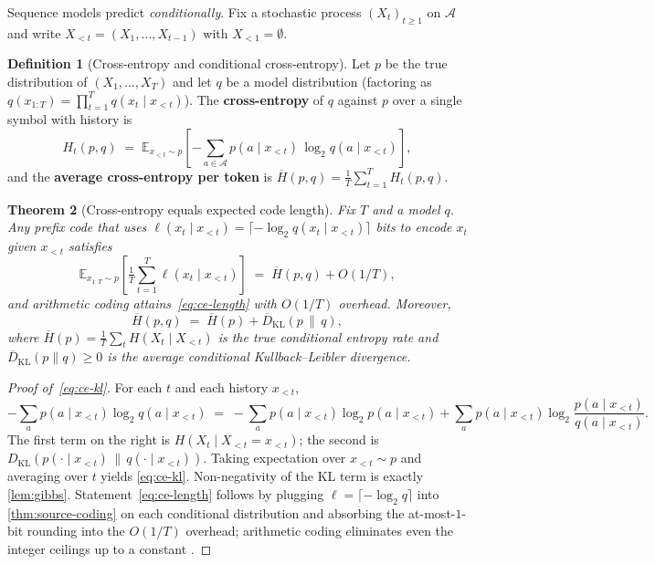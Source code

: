 \documentclass[12pt,a4paper]{article}
\theoremstyle{plain}
\newtheorem{theorem}{Theorem}[section]
\theoremstyle{definition}
\newtheorem{definition}[theorem]{Definition}
\begin{document}
Sequence models predict \emph{conditionally}.  Fix a stochastic
process $(X_t)_{t \ge 1}$ on $\mathcal{A}$ and write
$X_{<t} = (X_1, \dots, X_{t-1})$ with $X_{<1} = \emptyset$.

\begin{definition}[Cross-entropy and conditional cross-entropy]
\label{def:cross-ent}
Let $p$ be the true distribution of $(X_1, \dots, X_T)$ and let $q$ be
a model distribution (factoring as
$q(x_{1:T}) = \prod_{t=1}^{T} q(x_t \mid x_{<t})$).  The
\textbf{cross-entropy} of $q$ against $p$ over a single symbol with
history is
\begin{equation}
  H_t(p, q)
  \;=\; \mathbb{E}_{x_{<t}\sim p}\!\left[
    -\sum_{a\in\mathcal{A}} p(a \mid x_{<t})\,\log_2 q(a \mid x_{<t})
  \right],
  \label{eq:cross-ent}
\end{equation}
and the \textbf{average cross-entropy per token} is
$\overline{H}(p,q) = \tfrac{1}{T}\sum_{t=1}^{T} H_t(p,q)$.
\end{definition}

\begin{theorem}[Cross-entropy equals expected code length]
\label{thm:ce-code}
Fix $T$ and a model $q$.  Any prefix code that uses
$\ell(x_t \mid x_{<t}) = \lceil -\log_2 q(x_t \mid x_{<t})\rceil$
bits to encode $x_t$ given $x_{<t}$ satisfies
\begin{equation}
  \mathbb{E}_{x_{1:T}\sim p}\!\left[\tfrac{1}{T}\!\sum_{t=1}^{T}\ell(x_t \mid x_{<t})\right]
  \;=\; \overline{H}(p, q) + O(1/T),
  \label{eq:ce-length}
\end{equation}
and arithmetic coding attains~\eqref{eq:ce-length} with $O(1/T)$
overhead.  Moreover,
\begin{equation}
  \overline{H}(p, q)
  \;=\; \overline{H}(p) + \overline{D}_{\mathrm{KL}}(p \,\|\, q),
  \label{eq:ce-kl}
\end{equation}
where $\overline{H}(p) = \tfrac{1}{T}\sum_t H(X_t \mid X_{<t})$ is the
true conditional entropy rate and
$\overline{D}_{\mathrm{KL}}(p\|q) \ge 0$ is the average conditional
Kullback--Leibler divergence.
\end{theorem}

\begin{proof}[Proof of~\eqref{eq:ce-kl}]
For each $t$ and each history $x_{<t}$,
\[
  -\sum_{a} p(a\!\mid\! x_{<t})\log_2 q(a\!\mid\! x_{<t})
  \;=\;
  -\sum_{a} p(a\!\mid\! x_{<t})\log_2 p(a\!\mid\! x_{<t})
  + \sum_a p(a\!\mid\! x_{<t})\log_2\frac{p(a\!\mid\! x_{<t})}{q(a\!\mid\! x_{<t})}.
\]
The first term on the right is $H(X_t \mid X_{<t} = x_{<t})$; the
second is
$D_{\mathrm{KL}}(p(\cdot\mid x_{<t})\,\|\,q(\cdot\mid x_{<t}))$.
Taking expectation over $x_{<t} \sim p$ and averaging over $t$ yields
\eqref{eq:ce-kl}.  Non-negativity of the KL term is exactly
\cref{lem:gibbs}.  Statement~\eqref{eq:ce-length} follows by plugging
$\ell = \lceil -\log_2 q\rceil$ into \cref{thm:source-coding} on each
conditional distribution and absorbing the at-most-$1$-bit rounding
into the $O(1/T)$ overhead; arithmetic coding eliminates even the
integer ceilings up to a constant
\citep[Ch.~5]{coverthomas2006}.
\end{proof}
\end{document}
